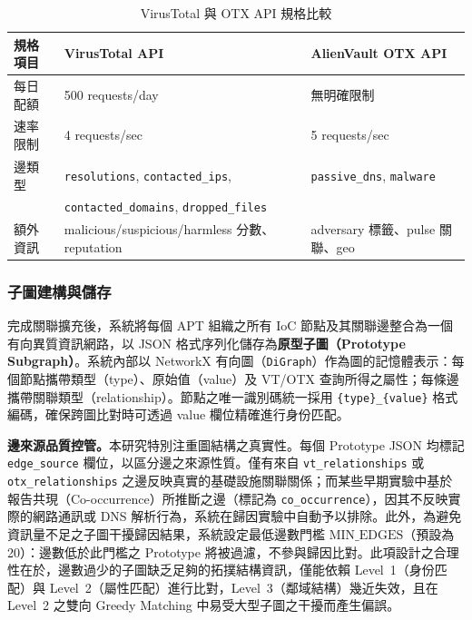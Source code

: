 \begin{ZhChapter}
\begin{table}[htbp]
    \centering
    \caption{VirusTotal 與 OTX API 規格比較}
    \label{tab:api-comparison}
    \renewcommand\arraystretch{1.2}
    \begin{tabular}{l l l}
        \hline
        \textbf{規格項目} & \textbf{VirusTotal API} & \textbf{AlienVault OTX API} \\
        \hline
        每日配額 & 500 requests/day & 無明確限制 \\
        速率限制 & 4 requests/sec & 5 requests/sec \\
        邊類型 & \texttt{resolutions}, \texttt{contacted\_ips}, & \texttt{passive\_dns}, \texttt{malware} \\
               & \texttt{contacted\_domains}, \texttt{dropped\_files} & \\
        額外資訊 & malicious/suspicious/harmless 分數、reputation & adversary 標籤、pulse 關聯、geo \\
        \hline
    \end{tabular}
\end{table}

\subsubsection{子圖建構與儲存}

完成關聯擴充後，系統將每個 APT 組織之所有 IoC 節點及其關聯邊整合為一個有向異質資訊網路，以 JSON 格式序列化儲存為\textbf{原型子圖（Prototype Subgraph）}。系統內部以 NetworkX 有向圖（\texttt{DiGraph}）作為圖的記憶體表示：每個節點攜帶類型（type）、原始值（value）及 VT/OTX 查詢所得之屬性；每條邊攜帶關聯類型（relationship）。節點之唯一識別碼統一採用 \texttt{\{type\}\_\{value\}} 格式編碼，確保跨圖比對時可透過 value 欄位精確進行身份匹配。

\textbf{邊來源品質控管。}本研究特別注重圖結構之真實性。每個 Prototype JSON 均標記 \texttt{edge\_source} 欄位，以區分邊之來源性質。僅有來自 \texttt{vt\_relationships} 或 \texttt{otx\_relationships} 之邊反映真實的基礎設施關聯關係；而某些早期實驗中基於報告共現（Co-occurrence）所推斷之邊（標記為 \texttt{co\_occurrence}），因其不反映實際的網路通訊或 DNS 解析行為，系統在歸因實驗中自動予以排除。此外，為避免資訊量不足之子圖干擾歸因結果，系統設定最低邊數門檻 $\text{MIN\_EDGES}$（預設為 20）：邊數低於此門檻之 Prototype 將被過濾，不參與歸因比對。此項設計之合理性在於，邊數過少的子圖缺乏足夠的拓撲結構資訊，僅能依賴 Level~1（身份匹配）與 Level~2（屬性匹配）進行比對，Level~3（鄰域結構）幾近失效，且在 Level~2 之雙向 Greedy Matching 中易受大型子圖之干擾而產生偏誤。


\end{ZhChapter}
